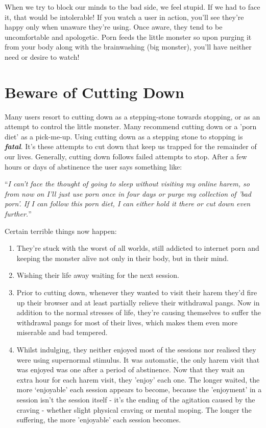 \documentclass[
]{book}
\begin{document}
When we try to block our minds to the bad side, we feel stupid. If we had to face it, that would be intolerable! If you watch a user in action, you'll see they're happy only when unaware they're using. Once aware, they tend to be uncomfortable and apologetic. Porn feeds the little monster so upon purging it from your body along with the brainwashing (big monster), you'll have neither need or desire to watch!

\hypertarget{beware-of-cutting-down}{%
\chapter{Beware of Cutting Down}\label{beware-of-cutting-down}}

Many users resort to cutting down as a stepping-stone towards stopping, or as an attempt to control the little monster. Many recommend cutting down or a 'porn diet' as a pick-me-up. Using cutting down as a stepping stone to stopping is \textbf{\emph{fatal}}. It's these attempts to cut down that keep us trapped for the remainder of our lives. Generally, cutting down follows failed attempts to stop. After a few hours or days of abstinence the user says something like:

``\emph{I can't face the thought of going to sleep without visiting my online harem, so from now on I'll just use porn once in four days or purge my collection of 'bad porn'. If I can follow this porn diet, I can either hold it there or cut down even further.}''

Certain terrible things now happen:

\begin{enumerate}
\def\labelenumi{\arabic{enumi}.}
\item
  They're stuck with the worst of all worlds, still addicted to internet porn and keeping the monster alive not only in their body, but in their mind.
\item
  Wishing their life away waiting for the next session.
\item
  Prior to cutting down, whenever they wanted to visit their harem they'd fire up their browser and at least partially relieve their withdrawal pangs. Now in addition to the normal stresses of life, they're causing themselves to suffer the withdrawal pangs for most of their lives, which makes them even more miserable and bad tempered.
\item
  Whilst indulging, they neither enjoyed most of the sessions nor realised they were using supernormal stimulus. It was automatic, the only harem visit that was enjoyed was one after a period of abstinence.
  Now that they wait an extra hour for each harem visit, they 'enjoy' each one. The longer waited, the more `enjoyable' each session appears to become, because the 'enjoyment' in a session isn't the session itself - it's the ending of the agitation caused by the craving - whether slight physical craving or mental moping. The longer the suffering, the more 'enjoyable' each session becomes.
\end{enumerate}
\end{document}
